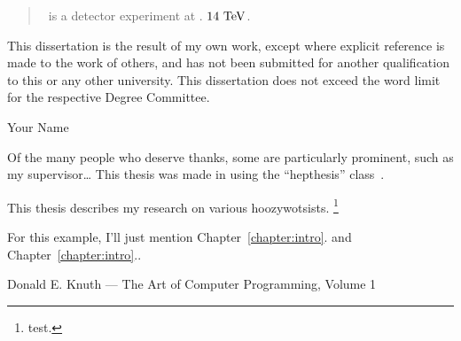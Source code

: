 

\begin{abstract}
\atlas\ is a detector experiment at \cern. $14~\eV[T]$.
\end{abstract}


\begin{declaration}
This dissertation is the result of my own work, except where explicit
reference is made to the work of others, and has not been submitted
for another qualification to this or any other university. This
dissertation does not exceed the word limit for the respective Degree
Committee.
\vspace*{1cm}
\begin{flushright}
Your Name
\end{flushright}
\end{declaration}


\begin{acknowledgements}
Of the many people who deserve thanks, some are particularly prominent,
such as my supervisor\dots
This thesis was made in \LaTeXe{} using the ``hepthesis'' class~\cite{hepthesis}.
\end{acknowledgements}


\begin{preface}
This thesis describes my research on various hoozywotsists.%
\footnote{test.}

\noindent
For this example, I'll just mention Chapter~\ref{chapter:intro}.
and Chapter~\ref{chapter:intro}..
\end{preface}


\tableofcontents

%
{Donald E. Knuth --- The Art of Computer Programming, Volume 1}

\thispagestyle{empty}

